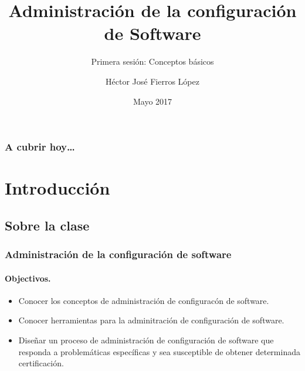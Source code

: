 

\title{Administraci\'on de la configuraci\'on de Software}

\subtitle{Primera sesi\'on: Conceptos b\'asicos}




\author{H\'ector Jos\'e Fierros L\'opez }


\date{Mayo 2017}

\subject{Talks}




\theoremstyle{definition}
\newtheorem{definicion}{Definici\'on}

\begin{frame}
\titlepage
\end{frame}

\begin{frame}
\frametitle{A cubrir hoy\ldots}
\tableofcontents
\end{frame}


\section{Introducci\'on}

\subsection[Sobre la clase]{Sobre la clase}

\begin{frame}
\frametitle{Administraci\'on de la configuraci\'on de software}
\framesubtitle{Objectivos.}

\begin{itemize}
  \item Conocer los conceptos de administraci\'on de configurac\'on de software.
  \item Conocer herramientas para la adminitraci\'on de configuraci\'on de
  software.
  \item Dise\~nar un proceso de administraci\'on de configuraci\'on de software 
  que responda a problem\'aticas espec\'ificas y sea susceptible de obtener
  determinada certificaci\'on. 
\end{itemize}
\end{frame}

